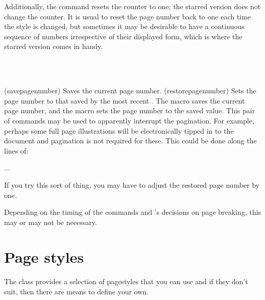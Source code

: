     Additionally, the \cmd{\pagenumbering}
command resets the  counter to one; the starred version does not 
change the counter.
    It is usual to reset the page number back to one each time the style
is changed, but sometimes it may be desirable to have a continuous sequence
of numbers irrespective of their displayed form, which is where
the starred version comes in handy.

\begin{syntax}
\cmd{\savepagenumber} \\
\cmd{\restorepagenumber} \\
\end{syntax}
\glossary(savepagenumber)%
  {}%
  {Saves the current page number.}
\glossary(restorepagenumber)%
  {}%
  {Sets the page number to that saved by the most recent .}
The macro \cmd{\savepagenumber} saves the current page number, and the
macro \cmd{\restorepagenumber} sets the page number to the saved value.
This pair of commands may be used to apparently 
interrupt the pagination.
For example, perhaps some full page illustrations 
will be electronically tipped in to the document and 
pagination is not required for these.
This could be done along the lines of:
\begin{lcode}
\clearpage          %
\savepagenumber     %
\pagestyle{empty}   %
\clearpage
\pagestyle{...}
\restorepagenumber
...
\end{lcode}
If you try this sort of thing, you may have to adjust the restored page 
number by one.
\begin{lcode}
\restorepagenumber
\end{lcode}
Depending on the timing of the  commands and \tx's 
decisions on page breaking, this may or may not be necessary.



\section{Page styles} \label{sec:pagestyles}


    The class provides a selection of pagestyles that you can use and if 
they don't suit, then there are means to define your own.

